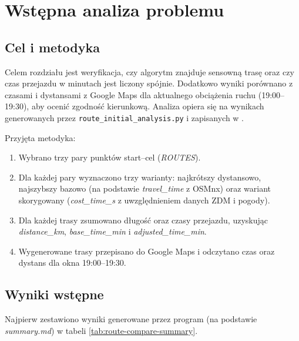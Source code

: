 \documentclass[12pt]{article}
\begin{document}
\section{Wstępna analiza problemu}

\subsection{Cel i metodyka}
Celem rozdziału jest weryfikacja, czy algorytm znajduje sensowną trasę oraz czy czas przejazdu
w minutach jest liczony spójnie. Dodatkowo wyniki porównano z czasami i dystansami z Google Maps
dla aktualnego obciążenia ruchu (19:00--19:30), aby ocenić zgodność kierunkową.
Analiza opiera się na wynikach generowanych przez \verb|route_initial_analysis.py| i zapisanych w
.

Przyjęta metodyka:
\begin{enumerate}
    \item Wybrano trzy pary punktów start--cel (\textit{ROUTES}).
    \item Dla każdej pary wyznaczono trzy warianty: najkrótszy dystansowo, najszybszy bazowo
    (na podstawie \textit{travel\_time} z OSMnx) oraz wariant skorygowany
    (\textit{cost\_time\_s} z uwzględnieniem danych ZDM i pogody).
    \item Dla każdej trasy zsumowano długość oraz czasy przejazdu, uzyskując
    \textit{distance\_km}, \textit{base\_time\_min} i \textit{adjusted\_time\_min}.
    \item Wygenerowane trasy przepisano do Google Maps i odczytano czas oraz dystans
    dla okna 19:00--19:30.
\end{enumerate}

\subsection{Wyniki wstępne}
Najpierw zestawiono wyniki generowane przez program (na podstawie \textit{summary.md})
w tabeli \ref{tab:route-compare-summary}.
\end{document}
